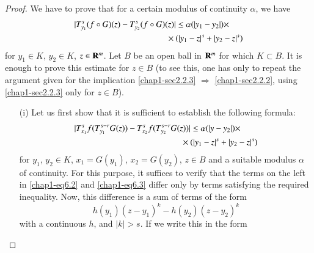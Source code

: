 \begin{proof}
We have to prove that for a certain modulus of continuity $\alpha$, we have
\setcounter{equation}{1}
\begin{align}
& |T^{s}_{y_{1}}(f\circ G)(z)-T^{s}_{y_{2}}(f\circ G)(z)|\leq \alpha (|y_{1}-y_{2}|)\times\notag\\
&\hspace{3.8cm} \times (|y_{1}-z|^{s}+|y_{2}-z|^{s})\label{chap1-eq6.2}
\end{align}
for $y_{1}\in K$, $y_{2}\in K$, $z\in \mathbf{R}^{m}$. Let $B$ be an open ball in $\mathbf{R}^{m}$ for which $K\subset B$. It is enough to prove this estimate for $z\in B$ (to see this, one has only to repeat the argument given for the implication \eqref{chap1-sec2.2.3} $\Rightarrow$ \eqref{chap1-sec2.2.2}, using \eqref{chap1-sec2.2.3} only for $z\in B$).
\begin{itemize}
\item[(i)] Let us first show that it is sufficient to establish the following formula:
\begin{align}
& |T^{s}_{x_{1}}f(T^{s-r}_{y_{1}}G(z))-T^{s}_{x_{2}}f(T^{s-r}_{y_{2}}G(z))|\leq \alpha(|y-y_{2}|)\times\notag\\
&\hspace{4.4cm} \times (|y_{1}-z|^{s}+|y_{2}-z|^{s})\label{chap1-eq6.3}
\end{align}
for $y_{1}$, $y_{2}\in K$, $x_{1}=G(y_{1})$, $x_{2}=G(y_{2})$, $z\in B$ and a suitable modulus $\alpha$ of continuity. For this purpose, it suffices to verify that the terms on the left in \eqref{chap1-eq6.2} and \eqref{chap1-eq6.3} differ only by terms satisfying the required inequality. Now, this difference is a sum of terms of the form
$$
h(y_{1})(z-y_{1})^{k}-h(y_{2})(z-y_{2})^{k}
$$
with a continuous $h$, and $|k|>s$. If we write this in the form
\end{itemize}
\end{proof}



